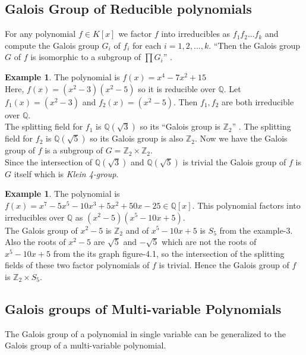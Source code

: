 \documentclass[11pt]{amsart}
\theoremstyle{plain}
\theoremstyle{definition}
\newtheorem{example}[theorem]{Example}
\numberwithin{equation}{section}
\begin{document}
\subsection{Galois Group of Reducible polynomials}
For any polynomial \(f \in K[x]\) we factor \(f\) into irreducibles as \(f_1f_2...f_k\) and compute the Galois group \(G_i\)  of \(f_i\) for each \(i=1,2,...,k\). ``Then the Galois group \(G\) of \(f\) is isomorphic to a subgroup of \(\prod G_i\)'' \cite{algorithm}.

\begin{example}
  The polynomial is \(f(x) = x^4-7x^2+15\)\\
  Here, \(f(x)=(x^2-3)(x^2-5)\) so it is reducible over \(\mathbb{Q}\). Let \(f_1(x)=(x^2-3)\) and \(f_2(x)=(x^2-5)\). Then \(f_1,f_2\) are both irreducible over \(\mathbb{Q}\).\\

  The splitting field for \(f_1\) is \(\mathbb{Q}(\sqrt{3})\) so its ``Galois group is \({\mathbb{Z}}_2\)'' \cite{hunger}. The splitting field for \(f_2\) is \(\mathbb{Q}(\sqrt{5})\) so its Galois group is also \({\mathbb{Z}}_2\). Now we have the Galois group of \(f\) is a subgroup of \(G={\mathbb{Z}}_2 \times {\mathbb{Z}}_2\). \\

  Since the intersection of \(\mathbb{Q}(\sqrt{3})\) and \(\mathbb{Q}(\sqrt{5})\) is trivial the Galois group of \(f\) is \(G\) itself which is \textit{Klein 4-group}.
\end{example}

\begin{example}
  The polynomial is \(f(x)=x^7-5x^5-10x^3+5x^2+50x-25 \in \mathbb{Q}[x]\). This polynomial factors into irreducibles over \(\mathbb{Q}\) as \((x^2-5)(x^5-10x+5)\).\\
  The Galois group of \(x^2-5\) is \({\mathbb{Z}}_2\) \cite{algorithm} and of \(x^5-10x+5\) is \(S_5\) from the example-3. Also the roots of \(x^2-5\) are \(\sqrt{5}\) and \(-\sqrt{5}\) which are not the roots of \(x^5-10x+5\) from the its graph figure-4.1, so the intersection of the splitting fields of these two factor polynomials of \(f\) is trivial. Hence the Galois group of \(f\) is \(\mathbb{Z}_2 \times S_5\).
\end{example}

\subsection{Galois groups of Multi-variable Polynomials}
The Galois group of a polynomial in single variable can be generalized to the Galois group of a multi-variable polynomial.
\end{document}
